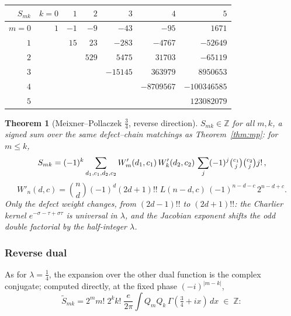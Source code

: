 \documentclass[11pt,a4paper]{article}
\newtheorem{theorem}{Theorem}[section]
\theoremstyle{definition}
\newcommand{\Z}{\mathbb{Z}}
\newcommand{\G}{\Gamma}
\begin{document}
\begin{tcolorbox}[colback=black!5, colframe=black!5, boxrule=0pt, sharp corners]
\begin{center}
\begin{tabular}{r|rrrrrr}
$S_{mk}$ & $k=0$ & $1$ & $2$ & $3$ & $4$ & $5$ \\
\hline
$m=0$ & $1$ & $-1$ & $-9$ & $-43$ & $-95$ & $1671$ \\
$1$ &  & $15$ & $23$ & $-283$ & $-4767$ & $-52649$ \\
$2$ &  &  & $529$ & $5475$ & $31703$ & $-65119$ \\
$3$ &  &  &  & $-15145$ & $363979$ & $8950653$ \\
$4$ &  &  &  &  & $-8709567$ & $-100346585$ \\
$5$ &  &  &  &  &  & $123082079$ \\
\end{tabular}
\end{center}
\end{tcolorbox}

\begin{tcolorbox}[colback=blue!5, colframe=blue!5, boxrule=0pt, sharp corners]
\begin{theorem}[Meixner--Pollaczek $\tfrac34$, reverse direction]
\label{thm:mp34rev}
$S_{mk} \in \Z$ for all $m,k$, a signed sum over the same
defect--chain matchings as Theorem~\ref{thm:mp}: for $m \le k$,
\[
  S_{mk} = (-1)^{k}
  \sum_{d_1, c_1, d_2, c_2}
  W'_m(d_1, c_1)\, W'_k(d_2, c_2)\,
  \sum_j (-1)^j \tbinom{c_1}{j}\tbinom{c_2}{j} j! \,,
\]
\[
  W'_n(d,c) = \binom{n}{d}(-1)^d (2d+1)!!\; L(n{-}d, c)\,
  (-1)^{n-d-c}\, 2^{n-d+c} .
\]
Only the defect weight changes, from $(2d-1)!!$ to $(2d+1)!!$: the
Charlier kernel $e^{-\sigma-\tau+\sigma\tau}$ is universal in
$\lambda$, and the Jacobian exponent shifts the odd double factorial
by the half-integer $\lambda$.
\end{theorem}
\end{tcolorbox}

\subsubsection*{Reverse dual}

As for $\lambda = \tfrac14$, the expansion over the other dual
function is the complex conjugate; computed directly, at the fixed
phase $(-i)^{|m-k|}$,
\[
  \widetilde S_{mk} = 2^m m!\; 2^k k!\; \frac{e}{2\pi}
  \int Q_m Q_k\, \G(\tfrac34+ix)\, dx \;\in\; \Z :
\]
\end{document}
